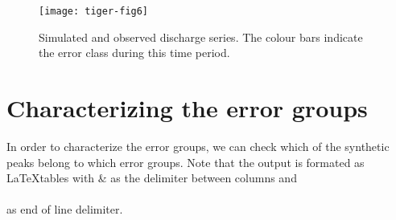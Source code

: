 \documentclass[a4paper]{article}
\begin{document}
\begin{figure}
\begin{center}
\texttt{[image: tiger-fig6]}
\end{center}
\caption{Simulated and observed discharge series. The colour bars indicate
the error class during this time period.}
\label{fig:errorsInTime}
\end{figure}

\section{Characterizing the error groups}
In order to characterize the error groups, we can check which of the
synthetic peaks belong to which error groups. Note that the output is
formated as \LaTeX tables with \& as the delimiter between columns and
\\\\ as end of line delimiter.
\end{document}
